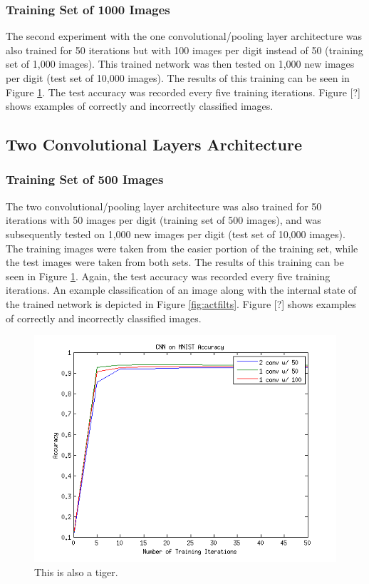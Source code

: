 \documentclass[10pt,twocolumn,letterpaper]{article}
\begin{document}
\subsubsection{Training Set of 1000 Images}

The second experiment with the one convolutional/pooling layer architecture was also trained
for 50 iterations but with 100 images per digit instead of 50 (training set of 1,000 images).
This trained network was then tested on 1,000 new images per digit (test set of 10,000 images).
The results of this training can be seen in Figure \ref{fig:accplot}.
The test accuracy was recorded every five training iterations.
Figure [?] shows examples of correctly and incorrectly classified images.

\subsection{Two Convolutional Layers Architecture}

\subsubsection{Training Set of 500 Images}

The two convolutional/pooling layer architecture was also trained for 50 iterations with 50 images per digit
(training set of 500 images), and was subsequently tested on 1,000 new images per digit
(test set of 10,000 images).
The training images were taken from the easier portion of the training set,
while the test images were taken from both sets.
The results of this training can be seen in Figure \ref{fig:accplot}.
Again, the test accuracy was recorded every five training iterations.
An example classification of an image along with the internal state of the trained network is depicted in
Figure \ref{fig:actfilts}.
Figure [?] shows examples of correctly and incorrectly classified images.

\begin{figure}
  \includegraphics[scale=0.55]{AccPlot}
  \caption{This is also a tiger.}
  \label{fig:accplot}
\end{figure}
\end{document}
